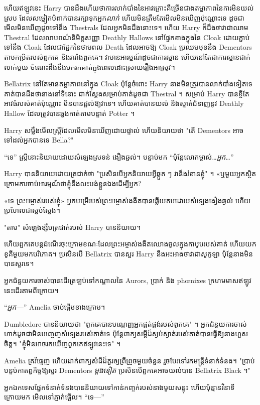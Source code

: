 {{ហើយឥឡូវនេះ Harry បានដឹងហើយថាការលាក់បាំងនៃអាវក្រោះគឺច្រើនជាងតម្លាភាពនៃការមិនយល់ស្រប ដែលសម្លៀកបំពាក់បានរក្សាទុកអ្នក\emph{លាក់} ហើយមិនត្រឹមតែមើលមិនឃើញប៉ុណ្ណោះទេ ដូចជាមើលមិនឃើញដូចទៅនឹង Thestrals ដែលអ្នកមិនដឹងនោះទេ។ ហើយ Harry ក៏ដឹងថាវាជាឈាម Thestral ដែលលាបពណ៌និមិត្តសញ្ញា Deathly Hallows នៅផ្នែកខាងក្នុងនៃ Cloak ដោយភ្ជាប់ទៅនឹង Cloak ដែលជាផ្នែកនៃថាមពល Death ដែលអាចឱ្យ Cloak ប្រឈមមុខនឹង Dementors តាមកម្រិតរបស់ពួកគេ និងរារាំងពួកគេ។ វាមានអារម្មណ៍ដូចជាការស្មាន ហើយនៅតែជាការស្មានជាក់លាក់មួយ ចំណេះដឹងនឹងមករកគាត់ក្នុងពេលដោះស្រាយរឿងអាស្រូវ។

Bellatrix នៅតែមានតម្លាភាពនៅក្នុង Cloak ប៉ុន្តែចំពោះ Harry នាងមិនត្រូវបានលាក់បាំងទៀតទេ គាត់បានដឹងថានាងនៅទីនោះ ជាក់ស្តែងសម្រាប់គាត់ដូចជា Thestral ។ សម្រាប់ Harry បានខ្ចីតែអាវធំរបស់គាត់ប៉ុណ្ណោះ មិនបានផ្តល់ឱ្យវាទេ។ ហើយគាត់បានយល់ និងស្ទាត់ជំនាញនូវ Deathly Hallow ដែលត្រូវបានឆ្លងកាត់តាមបន្ទាត់ Potter ។

Harry សម្លឹងមើលស្ត្រីដែលមើលមិនឃើញដោយផ្ទាល់ ហើយនិយាយថា "តើ Dementors អាចទៅដល់អ្នកបានទេ Bella?"

“ទេ” ស្ត្រីនោះនិយាយដោយសំឡេងស្រទន់ ងឿងឆ្ងល់។ បន្ទាប់មក “ប៉ុន្តែលោកម្ចាស់…\emph{អ្នក}…”

Harry បាននិយាយដោយត្រជាក់ថា "ប្រសិនបើអ្នកនិយាយអ្វីឆ្កួត ៗ វានឹងរំខានខ្ញុំ" ។ «ឬ​មួយ​អ្នក​ស្ថិត​ក្រោម​ការ​ចាប់​អារម្មណ៍​ថា​ខ្ញុំ​នឹង​លះបង់​ខ្លួន​ឯង​ដើម្បី​អ្នក?

«ទេ ព្រះអម្ចាស់របស់ខ្ញុំ» អ្នកបម្រើរបស់ព្រះអម្ចាស់ងងឹតបានឆ្លើយតបដោយសំឡេងងឿងឆ្ងល់ ហើយប្រហែលជាស្ញប់ស្ញែង។

"តាម" សំឡេងខ្សឹបត្រជាក់របស់ Harry បាននិយាយ។

ហើយ​ពួកគេ​បន្ត​ដំណើរ​ចុះ​ក្រោម​ខណៈ​ដែល​ព្រះអម្ចាស់​ងងឹត​ឈោង​ចូល​ក្នុង​កាបូប​របស់​គាត់ ហើយ​យក​ខូគី​មួយ​មក​បរិភោគ។ ប្រសិនបើ Bellatrix បានសួរ Harry នឹងអះអាងថាវាជាសូកូឡា ប៉ុន្តែនាងមិនបានសួរទេ។

\later

អ្នកជំនួយការចាស់បានដើរត្រឡប់ទៅកណ្តាលនៃ Aurors, ប្រាក់ និង phœnixes ក្រហមមាសឥឡូវនេះដើរតាមពីក្រោយ។

“\emph{អ្នក—}” Amelia ចាប់ផ្តើមខាងក្រោម។

Dumbledore បាននិយាយថា "ពួកគេបានបណ្តេញអ្នកផ្គត់ផ្គង់របស់ពួកគេ" ។ អ្នកជំនួយការចាស់ហាក់ដូចជាមិនបញ្ចេញសំឡេងរបស់គាត់ទេ ប៉ុន្តែពាក្យសម្ដីដ៏ស្ងប់ស្ងាត់របស់គាត់បានធ្វើឱ្យនាងហួសចិត្ត។ "ខ្ញុំមិនអាចរកឃើញពួកគេឥឡូវនេះទេ" ។

Amelia គ្រវី​ធ្មេញ ហើយ​ដាក់​ពាក្យ​សំដី​ដ៏​គួរ​ឲ្យ​ព្រឺព្រួច​មួយ​ចំនួន រួច​បែរ​ទៅ​រក​មន្ត្រី​ទំនាក់ទំនង។ "ប្រាប់បន្ទប់កាតព្វកិច្ចឱ្យសួរ Dementors \emph{ម្តងទៀត} ប្រសិនបើពួកគេអាចយល់បាន Bellatrix Black ។"

អ្នកឯកទេសផ្នែកទំនាក់ទំនងបាននិយាយទៅកាន់កញ្ចក់របស់នាងមួយសន្ទុះ ហើយប៉ុន្មានវិនាទីក្រោយមក មើលទៅភ្ញាក់ផ្អើល។ “ទេ—”

}}
